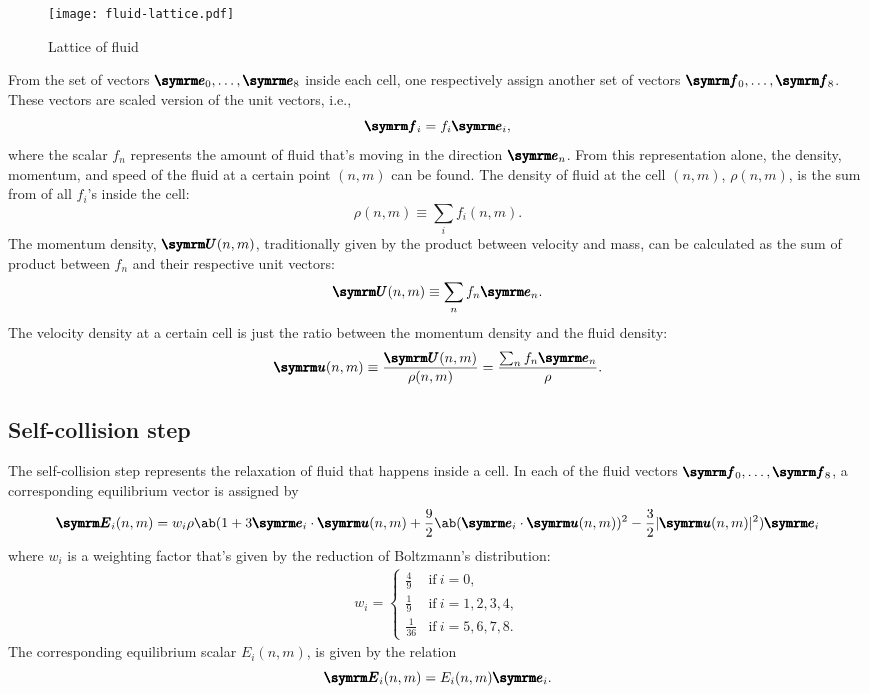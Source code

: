 \begin{figure}[ht]
	\centering
	\texttt{[image: fluid-lattice.pdf]}
	\caption{Lattice of fluid}
	\label{fig:fluid-lattice}
\end{figure}

From the set of vectors $\vv{e}_0, \dots, \vv{e}_8$ inside each cell, one respectively assign another set of vectors $\vv{f}_0, \dots, \vv{f}_8$. These vectors are scaled version of the unit vectors, i.e.,
\begin{equation}
	\vv{f}_i = f_i\vv{e}_i,
\end{equation}
where the scalar $f_n$ represents the amount of fluid that's moving in the direction $\vv{e}_n$. From this representation alone, the density, momentum, and speed of the fluid at a certain point $(n, m)$ can be found. The density of fluid at the cell $(n, m)$, $\rho(n, m)$, is the sum from of all $f_i$'s inside the cell:
\begin{equation}
	\rho(n, m) \equiv \sum_if_i(n, m). \label{eq:density-calculation}
\end{equation}
The momentum density, $\vv{U}(n, m)$, traditionally given by the product between velocity and mass, can be calculated as the sum of product between $f_n$ and their respective unit vectors:
\begin{equation}
	\vv{U}(n, m) \equiv \sum_nf_n\vv{e}_n. \label{eq:momentum-calculation}
\end{equation}
The velocity density at a certain cell is just the ratio between the momentum density and the fluid density:
\begin{equation}
	\vv{u}(n, m) \equiv \frac{\vv{U}(n, m)}{\rho(n, m)} = \frac{\sum_nf_n\vv{e}_n}{\rho}. \label{eq:velocity-calculation}
\end{equation}

\subsection{Self-collision step}

The self-collision step represents the relaxation of fluid that happens inside a cell. In each of the fluid vectors $\vv{f}_0,\dots,\vv{f}_8$, a corresponding equilibrium vector is assigned by
\begin{equation}
	\vv{E}_i(n, m) = w_i\rho\ab(1 + 3\vv{e}_i \cdot \vv{u}(n, m) + \frac{9}{2}\ab(\vv{e}_i \cdot \vv{u}(n, m))^2 - \frac{3}{2}|\vv{u}(n, m)|^2)\vv{e}_i \label{eq:self-collision-calculation-1}
\end{equation}
where $w_i$ is a weighting factor that's given by the reduction of Boltzmann's distribution:
\begin{gather}
	w_i = \begin{cases}
		\frac{4}{9}  & \textrm{if} ~ i = 0,          \\
		\frac{1}{9}  & \textrm{if} ~ i = 1, 2, 3, 4, \\
		\frac{1}{36} & \textrm{if} ~ i = 5, 6, 7, 8.
	\end{cases}
\end{gather}
The corresponding equilibrium scalar $E_i(n, m)$, is given by the relation
\begin{equation}
	\vv{E}_i(n, m) = E_i(n, m)\vv{e}_i.
\end{equation}


